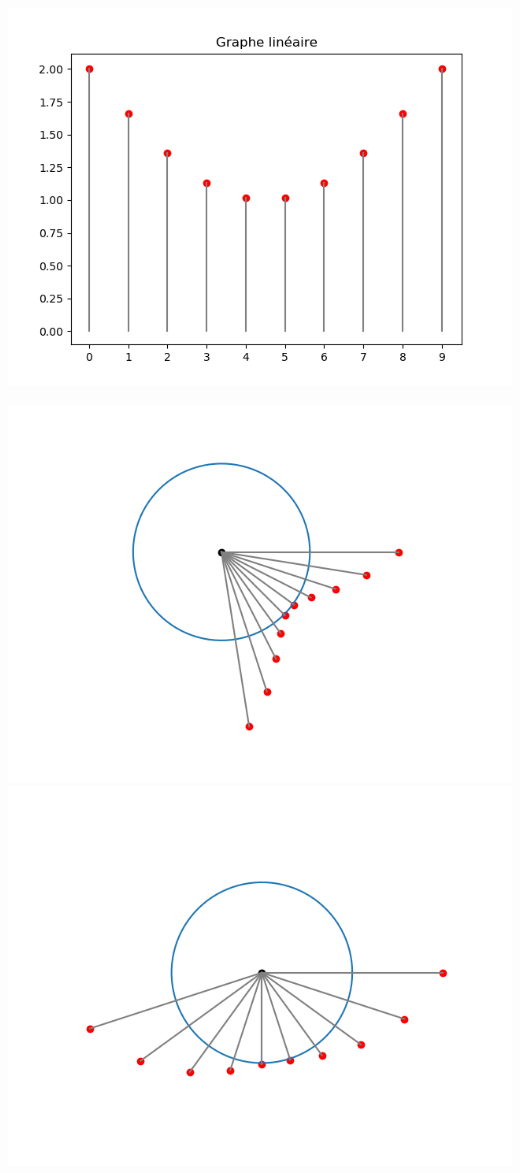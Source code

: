 \documentclass[11pt,class=report,crop=false]{standalone}
\begin{document}
\begin{center}
\includegraphics[scale=\myscale,scale=0.5]{figures/fourier-3a}

\includegraphics[scale=\myscale,scale=0.4]{figures/fourier-3b}
\includegraphics[scale=\myscale,scale=0.4]{figures/fourier-3c}


\end{center}
\end{document}
